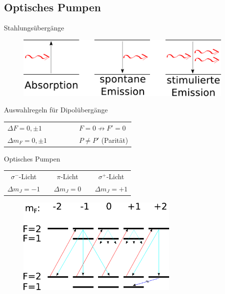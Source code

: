 \documentclass{beamer}
\begin{document}
\subsection{Optisches Pumpen}
\begin{frame}{Stahlungsübergänge}
	\begin{figure}[H]
	\centering \includegraphics[width=0.95\textwidth]{Bilder/Strahlungsuebergaenge.pdf}
	\end{figure}
\begin{block}{Auswahlregeln für Dipolübergänge}
\begin{center}
\begin{tabular}{l c l}
$\Delta F = 0, \pm 1$ & \, \, \, \, \, \, & $F=0 \not\to F'=0$\\
$\Delta m_F = 0, \pm 1$ &  \, \, \, \, \, \,  & $P \neq P'$ (Parität)\\
\end{tabular}
\end{center}
\end{block}
\end{frame}

\begin{frame}{Optisches Pumpen}
\begin{center}
\begin{tabular}{| c c c |} \hline
$\sigma^-$-Licht 	& \,\,\,\,	$\pi$-Licht \,\,\,\,	 	&	\alert{$\sigma^+$-Licht} 	\\
$\Delta m_J = -1$	& \,\,\,\,	$\Delta m_J = 0$ \,\,\,\,	&	\alert{$\Delta m_J = +1$}	\\ \hline
\end{tabular}
\end{center}
	\begin{figure}[H]
	\centering \includegraphics[width=0.7\textwidth]{Bilder/OP87Rb.pdf}
	\end{figure}
\end{frame}
\end{document}
